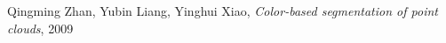 \documentclass[12pt,titlepage,french]{article}
\begin{document}

\begin{thebibliography}{3}

 Qingming Zhan, Yubin Liang, Yinghui Xiao, \textit{Color-based segmentation of point clouds}, 2009
\end{thebibliography}
\end{document}
